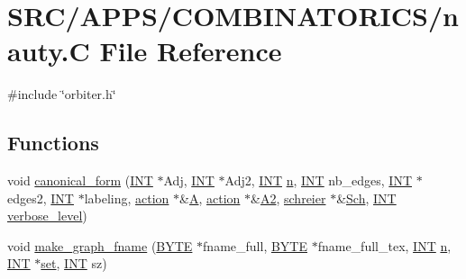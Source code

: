 \hypertarget{_a_p_p_s_2_c_o_m_b_i_n_a_t_o_r_i_c_s_2nauty_8_c}{}\section{S\+R\+C/\+A\+P\+P\+S/\+C\+O\+M\+B\+I\+N\+A\+T\+O\+R\+I\+C\+S/nauty.C File Reference}
\label{_a_p_p_s_2_c_o_m_b_i_n_a_t_o_r_i_c_s_2nauty_8_c}
{\ttfamily \#include \char`\"{}orbiter.\+h\char`\"{}}\newline
\subsection*{Functions}
\begin{DoxyCompactItemize}
\item 
void \mbox{\hyperlink{_a_p_p_s_2_c_o_m_b_i_n_a_t_o_r_i_c_s_2nauty_8_c_a10dfaf42b6fbfd957f702a797af64457}{canonical\+\_\+form}} (\mbox{\hyperlink{galois_8h_a09fddde158a3a20bd2dcadb609de11dc}{I\+NT}} $\ast$Adj, \mbox{\hyperlink{galois_8h_a09fddde158a3a20bd2dcadb609de11dc}{I\+NT}} $\ast$Adj2, \mbox{\hyperlink{galois_8h_a09fddde158a3a20bd2dcadb609de11dc}{I\+NT}} \mbox{\hyperlink{simeon_8_c_a7f2cd26777ce0ff3fdaf8d02aacbddfb}{n}}, \mbox{\hyperlink{galois_8h_a09fddde158a3a20bd2dcadb609de11dc}{I\+NT}} nb\+\_\+edges, \mbox{\hyperlink{galois_8h_a09fddde158a3a20bd2dcadb609de11dc}{I\+NT}} $\ast$edges2, \mbox{\hyperlink{galois_8h_a09fddde158a3a20bd2dcadb609de11dc}{I\+NT}} $\ast$labeling, \mbox{\hyperlink{classaction}{action}} $\ast$\&\mbox{\hyperlink{simeon_8_c_a97833f04c3a9c008df5521a2fc291bb4}{A}}, \mbox{\hyperlink{classaction}{action}} $\ast$\&\mbox{\hyperlink{simeon_8_c_a13fda35b8976a20080ec22b9d9e44e5b}{A2}}, \mbox{\hyperlink{classschreier}{schreier}} $\ast$\&\mbox{\hyperlink{simeon_8_c_acbdfb9c3c18b898a9750f161e7255a6c}{Sch}}, \mbox{\hyperlink{galois_8h_a09fddde158a3a20bd2dcadb609de11dc}{I\+NT}} \mbox{\hyperlink{simeon_8_c_a818073fbcc2f439e7c56952f67386122}{verbose\+\_\+level}})
\item 
void \mbox{\hyperlink{_a_p_p_s_2_c_o_m_b_i_n_a_t_o_r_i_c_s_2nauty_8_c_a1af24683536770c91869ef9785e99c68}{make\+\_\+graph\+\_\+fname}} (\mbox{\hyperlink{galois_8h_ab6cc7b4aeb6ea31aba2b3fbfc83ff5e6}{B\+Y\+TE}} $\ast$fname\+\_\+full, \mbox{\hyperlink{galois_8h_ab6cc7b4aeb6ea31aba2b3fbfc83ff5e6}{B\+Y\+TE}} $\ast$fname\+\_\+full\+\_\+tex, \mbox{\hyperlink{galois_8h_a09fddde158a3a20bd2dcadb609de11dc}{I\+NT}} \mbox{\hyperlink{simeon_8_c_a7f2cd26777ce0ff3fdaf8d02aacbddfb}{n}}, \mbox{\hyperlink{galois_8h_a09fddde158a3a20bd2dcadb609de11dc}{I\+NT}} $\ast$\mbox{\hyperlink{nauty_8h_a9690bea211101f22a5e154087590c3da}{set}}, \mbox{\hyperlink{galois_8h_a09fddde158a3a20bd2dcadb609de11dc}{I\+NT}} sz)

\end{DoxyCompactItemize}
